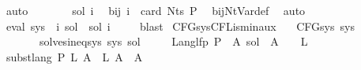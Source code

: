 \begin{isabellebody}
\ auto\isanewline
\ \ \isamarkupfalse%
\ \isamarkupfalse%
\ {\isachardoublequoteopen}{\isasymdots}\ {\isacharequal}{\kern0pt}\ sol\ i{\isachardoublequoteclose}\ \isamarkupfalse%
\ bij{\isacharunderscore}{\kern0pt}{\isasymgamma}{\isacharunderscore}{\kern0pt}{\isasymgamma}{\isacharprime}{\kern0pt}\ {\isacartoucheopen}i\ {\isacharless}{\kern0pt}\ card\ {\isacharparenleft}{\kern0pt}Nts\ P{\isacharparenright}{\kern0pt}{\isacartoucheclose}\ \isamarkupfalse%
\ bij{\isacharunderscore}{\kern0pt}Nt{\isacharunderscore}{\kern0pt}Var{\isacharunderscore}{\kern0pt}def\ \isamarkupfalse%
\ auto\isanewline
\ \ \isamarkupfalse%
\ \isamarkupfalse%
\ {\isachardoublequoteopen}eval\ {\isacharparenleft}{\kern0pt}sys\ {\isacharbang}{\kern0pt}\ i{\isacharparenright}{\kern0pt}\ sol\ {\isasymsubseteq}\ sol\ i{\isachardoublequoteclose}\ \isamarkupfalse%
\ {}\ \isamarkupfalse%
\ blast\isanewline
{}\isamarkupfalse%
%
\endisatagproof
{\isafoldproof}%
%
\isadelimproof
\isanewline
%
\endisadelimproof
\isanewline
{}\isamarkupfalse%
\ CFG{\isacharunderscore}{\kern0pt}sys{\isacharunderscore}{\kern0pt}CFL{\isacharunderscore}{\kern0pt}is{\isacharunderscore}{\kern0pt}min{\isacharunderscore}{\kern0pt}aux{\isacharcolon}{\kern0pt}\isanewline
\ \ \ {\isachardoublequoteopen}CFG{\isacharunderscore}{\kern0pt}sys\ sys{\isachardoublequoteclose}\isanewline
\ \ \ \ \ \ \ {\isachardoublequoteopen}solves{\isacharunderscore}{\kern0pt}ineq{\isacharunderscore}{\kern0pt}sys\ sys\ sol{\isacharprime}{\kern0pt}{\isachardoublequoteclose}\isanewline
\ \ \ \ \ {\isachardoublequoteopen}Lang{\isacharunderscore}{\kern0pt}lfp\ P\ {\isasymle}\ {\isacharparenleft}{\kern0pt}{\isasymlambda}A{\isachardot}{\kern0pt}\ sol{\isacharprime}{\kern0pt}\ {\isacharparenleft}{\kern0pt}{\isasymgamma}{\isacharprime}{\kern0pt}\ A{\isacharparenright}{\kern0pt}{\isacharparenright}{\kern0pt}{\isachardoublequoteclose}\ {\isacharparenleft}{\kern0pt}\ {\isachardoublequoteopen}{\isacharunderscore}{\kern0pt}\ {\isasymle}\ {\isacharquery}{\kern0pt}L{\isacharprime}{\kern0pt}{\isachardoublequoteclose}{\isacharparenright}{\kern0pt}\isanewline
%
\isadelimproof
%
\endisadelimproof
%
\isatagproof
{}\isamarkupfalse%
\ {\isacharminus}{\kern0pt}\isanewline
\ \ \isamarkupfalse%
\ {\isachardoublequoteopen}subst{\isacharunderscore}{\kern0pt}lang\ P\ {\isacharquery}{\kern0pt}L{\isacharprime}{\kern0pt}\ A\ {\isasymsubseteq}\ {\isacharquery}{\kern0pt}L{\isacharprime}{\kern0pt}\ A{\isachardoublequoteclose}\ \ A\isanewline

\end{isabellebody}
